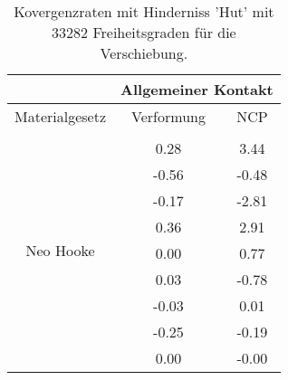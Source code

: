 \begin{table} 
\centering 
\begin{tabular}{c|cc|} 
\cline{2-3} 
 & \multicolumn{2}{|c|}{Allgemeiner Kontakt} \\ 
\hline 
\multicolumn{1}{|c|}{Materialgesetz} & \multicolumn{1}{c|}{Verformung} & \multicolumn{1}{c|}{NCP} \\ 
\hline 
\multicolumn{1}{|c|}{\multirow{10}{*}{Neo Hooke}} &\multicolumn{1}{|c|}{} & \multicolumn{1}{|c|}{} \\ 
\multicolumn{1}{|c|}{} & \multicolumn{1}{|c|}{      0.28} & \multicolumn{1}{|c|}{      3.44} \\ 
\multicolumn{1}{|c|}{} & \multicolumn{1}{|c|}{     -0.56} & \multicolumn{1}{|c|}{     -0.48} \\ 
\multicolumn{1}{|c|}{} & \multicolumn{1}{|c|}{     -0.17} & \multicolumn{1}{|c|}{     -2.81} \\ 
\multicolumn{1}{|c|}{} & \multicolumn{1}{|c|}{      0.36} & \multicolumn{1}{|c|}{      2.91} \\ 
\multicolumn{1}{|c|}{} & \multicolumn{1}{|c|}{      0.00} & \multicolumn{1}{|c|}{      0.77} \\ 
\multicolumn{1}{|c|}{} & \multicolumn{1}{|c|}{      0.03} & \multicolumn{1}{|c|}{     -0.78} \\ 
\multicolumn{1}{|c|}{} & \multicolumn{1}{|c|}{     -0.03} & \multicolumn{1}{|c|}{      0.01} \\ 
\multicolumn{1}{|c|}{} & \multicolumn{1}{|c|}{     -0.25} & \multicolumn{1}{|c|}{     -0.19} \\ 
\multicolumn{1}{|c|}{} & \multicolumn{1}{|c|}{      0.00} & \multicolumn{1}{|c|}{     -0.00} \\ 
\hline 
\end{tabular}\caption{Kovergenzraten mit Hinderniss 'Hut' mit 33282 Freiheitsgraden für die Verschiebung.}\label{tab:Rate_Hut_level6}
\end{table} 
